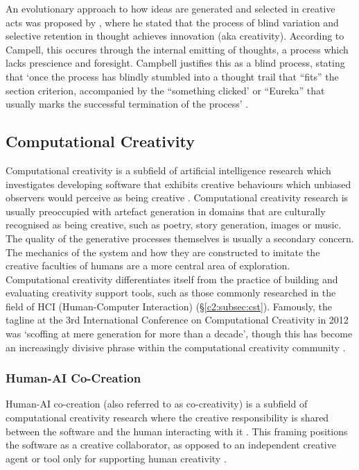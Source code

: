 An evolutionary approach to how ideas are generated and selected in creative acts was proposed by \cite{campbell1960blind}, where he stated that the process of blind variation and selective retention in thought achieves innovation (aka creativity).
According to Campell, this occures through the internal emitting of thoughts, a process which lacks prescience and foresight.
Campbell justifies this as a blind process, stating that `once the process has blindly stumbled into a thought trail that ``fits'' the section criterion, accompanied by the ``something clicked' or ``Eureka'' that usually marks the successful termination of the process' \citep{campbell1960blind}.

\subsection{Computational Creativity}

Computational creativity is a subfield of artificial intelligence research which investigates developing software that exhibits creative behaviours which unbiased observers would perceive as being creative \citep{colton2012computational}.
Computational creativity research is usually preoccupied with artefact generation in domains that are culturally recognised as being creative, such as  poetry, story generation, images or music.
The quality of the generative processes themselves is usually a secondary concern.
The mechanics of the system and how they are constructed to imitate the creative faculties of humans are a more central area of exploration.
Computational creativity differentiates itself from the practice of building and evaluating creativity support tools, such as those commonly researched in the field of HCI (Human-Computer Interaction) (\S \ref{c2:subsec:cst}).
Famously, the tagline at the 3rd International Conference on Computational Creativity in 2012 was ‘scoffing at mere generation for more than a decade’, though this has become an increasingly divisive phrase within the computational creativity community \citep{ventura2016mere}.

\subsubsection{Human-AI Co-Creation}
\label{c2:subsubsec:co-creativity}

Human-AI co-creation (also referred to as co-creativity) is a subfield of computational creativity research where the creative responsibility is shared between the software and the human interacting with it \citep{candy2002modeling}.
This framing positions the software as a creative collaborator, as opposed to an independent creative agent or tool only for supporting human creativity \citep{feldman2017co}.

